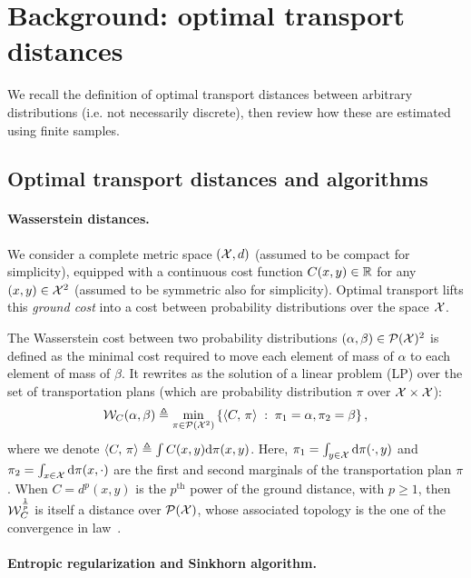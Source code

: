 \section{Background: optimal transport distances}

We recall the definition of optimal transport distances between arbitrary distributions (i.e. not necessarily discrete), then review how these are estimated using finite samples.

\subsection{Optimal transport distances and algorithms}

\paragraph{Wasserstein distances.} 

We consider a complete metric space $(\mathcal{X},d)$ (assumed to be compact for simplicity), equipped
with a continuous cost function $C(x,y) \in \mathbb{R}$ for any $(x,y) \in \mathcal{X}^2$ (assumed to be symmetric also for simplicity). 
%
Optimal transport lifts this \textit{ground cost} into a cost between probability
distributions over the space $\mathcal{X}$. 
%

The Wasserstein cost between two probability distributions $(\alpha, \beta) \in \mathcal{P}(\mathcal{X})^2$ is defined as the minimal cost required to move each element of mass of $\alpha$ to each element of mass of $\beta$. It rewrites as the solution of a
linear problem (LP) over the set of transportation plans (which are probability distribution $\pi$ over $\mathcal{X} \times \mathcal{X}$):
\begin{equation}\label{eq:wass}
    \mathcal{W}_C(\alpha, \beta) \triangleq 
    \min_{\pi \in \mathcal{P}(\mathcal{X}^2)}
    \left\{ 
    	\langle C,\,\pi\rangle
	 \;:\;  \pi_1=\alpha, \pi_2=\beta \right\},
\end{equation}
where we denote $\langle C,\,\pi\rangle \triangleq \int C(x,y) \textrm{d}\pi(x,y)$. Here,  
$\pi_1 = \int_{y\in \mathcal{X}} \textrm{d} \pi(\cdot, y)$ and $\pi_2 = \int_{x\in \mathcal{X}} \textrm{d}
\pi(x, \cdot)$ are the first and second marginals of the transportation plan $\pi$. 
%
When $C=d^p(x,y)$ is the $p^{\text{th}}$ power of the ground distance, with $p \geq 1$, then $\mathcal{W}_C^{\frac{1}{p}}$ is itself a distance over $\mathcal{P}(\mathcal{X})$, whose associated topology is the one of the convergence in law~\cite{santambrogio2015optimal}.

\paragraph{Entropic regularization and Sinkhorn algorithm.} 

